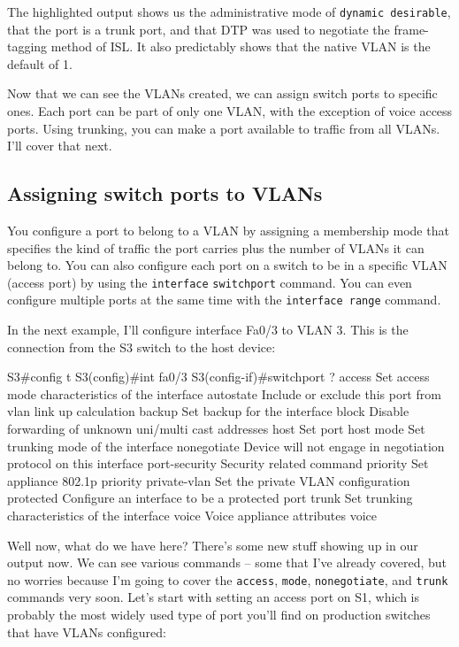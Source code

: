 The highlighted output shows us the administrative mode of
\texttt{dynamic\ desirable}, that the port is a trunk port, and that DTP
was used to negotiate the frame-tagging method of ISL. It also
predictably shows that the native VLAN is the default of 1.

Now that we can see the VLANs created, we can assign switch ports to
specific ones. Each port can be part of only one VLAN, with the
exception of voice access ports. Using trunking, you can make a port
available to traffic from all VLANs. I'll cover that next.

\subsection{Assigning switch ports to VLANs}

You configure a port to belong to a VLAN by assigning a membership mode
that specifies the kind of traffic the port carries plus the number of
VLANs it can belong to. You can also configure each port on a switch to
be in a specific VLAN (access port) by using the
\texttt{inter}\texttt{face} \texttt{switchport} command. You can even
configure multiple ports at the same time with the
\texttt{interface\ range} command.

In the next example, I'll configure interface Fa0/3 to VLAN 3. This is
the connection from the S3 switch to the host device:

\begin{cli}
S3#config t
S3(config)#int fa0/3
S3(config-if)#switchport ?
  access         Set access mode characteristics of the interface
  autostate      Include or exclude this port from vlan link up calculation
  backup         Set backup for the interface
  block          Disable forwarding of unknown uni/multi cast addresses
  host           Set port host
  mode           Set trunking mode of the interface
  nonegotiate    Device will not engage in negotiation protocol on this
                 interface
  port-security  Security related command
  priority       Set appliance 802.1p priority
  private-vlan   Set the private VLAN configuration
  protected      Configure an interface to be a protected port
  trunk          Set trunking characteristics of the interface
  voice          Voice appliance attributes  voice
\end{cli}

Well now, what do we have here? There's some new stuff showing up in our
output now. We can see various commands -- some that I've already
covered, but no worries because I'm going to cover the \texttt{access},
\texttt{mode}, \texttt{nonegotiate}, and \texttt{trunk} commands very
soon. Let's start with setting an access port on S1, which is probably
the most widely used type of port you'll find on production switches
that have VLANs configured:

